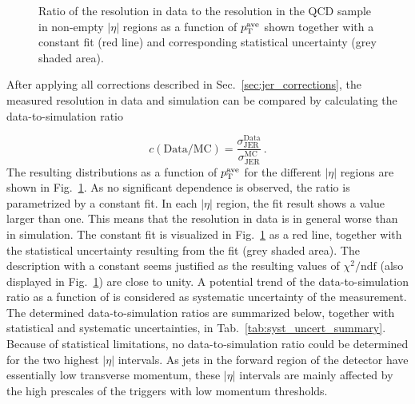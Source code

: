\begin{figure}[!htp]
\begin{tabular}{cc}
  \end{tabular}
  \caption{Ratio of the resolution in data to the resolution in the \pythia QCD sample in non-empty $|\eta|$ regions as a function of $p_{\text{T}}^\mathrm{ave}$ shown together with a constant fit (red line) and corresponding statistical uncertainty (grey shaded area).}
  \label{fig:ratio}
\end{figure}
After applying all corrections described in Sec.~\ref{sec:jer_corrections}, the measured resolution in data and simulation can be compared by calculating the data-to-simulation ratio

\begin{equation}
  c(\mathrm{Data}/\mathrm{MC}) = \frac{ \sigma_\mathrm{JER}^\mathrm{Data}}{ \sigma_\mathrm{JER}^\mathrm{MC}} \, .
 \end{equation}
The resulting distributions as a function of $p_{\text{T}}^\mathrm{ave}$ for the different $|\eta|$ regions are shown in Fig.~\ref{fig:ratio}. As no significant \pt dependence is observed, the ratio is parametrized by a constant fit. In each $|\eta|$ region, the fit result shows a value larger than one. This means that the resolution in data is in general worse than in simulation. The constant fit is visualized in Fig.~\ref{fig:ratio} as a red line, together with the statistical uncertainty resulting from the fit (grey shaded area). The description with a constant seems justified as the resulting values of $\chi^2/\mathrm{ndf}$ (also displayed in Fig.~\ref{fig:ratio}) are close to unity. A potential trend of the data-to-simulation ratio as a function of \ptave is considered as systematic uncertainty of the measurement. The determined data-to-simulation ratios are summarized below, together with statistical and systematic uncertainties, in Tab.~\ref{tab:syst_uncert_summary}. Because of statistical limitations, no data-to-simulation ratio could be determined for the two highest $|\eta|$ intervals. As jets in the forward region of the detector have essentially low transverse momentum, these $|\eta|$ intervals are mainly affected by the high prescales of the triggers with low momentum thresholds.   
 
